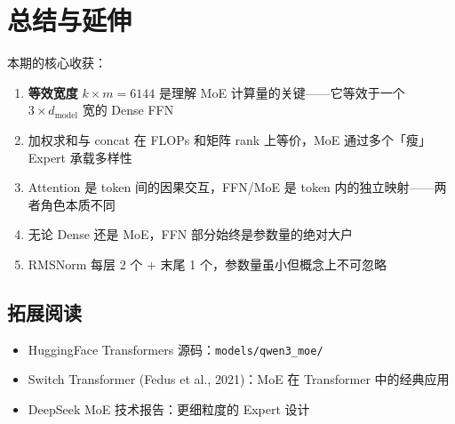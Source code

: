 \documentclass[a4paper]{article}
\begin{document}
\section{总结与延伸}

本期的核心收获：

\begin{enumerate}
  \item \textbf{等效宽度} $k \times m = 6144$ 是理解 MoE 计算量的关键——它等效于一个 $3 \times d_{\text{model}}$ 宽的 Dense FFN
  \item 加权求和与 concat 在 FLOPs 和矩阵 rank 上等价，MoE 通过多个「瘦」Expert 承载多样性
  \item Attention 是 token 间的因果交互，FFN/MoE 是 token 内的独立映射——两者角色本质不同
  \item 无论 Dense 还是 MoE，FFN 部分始终是参数量的绝对大户
  \item RMSNorm 每层 2 个 + 末尾 1 个，参数量虽小但概念上不可忽略
\end{enumerate}

\subsection{拓展阅读}

\begin{itemize}
  \item HuggingFace Transformers 源码：\texttt{models/qwen3\_moe/}
  \item Switch Transformer (Fedus et al., 2021)：MoE 在 Transformer 中的经典应用
  \item DeepSeek MoE 技术报告：更细粒度的 Expert 设计
\end{itemize}
\end{document}
